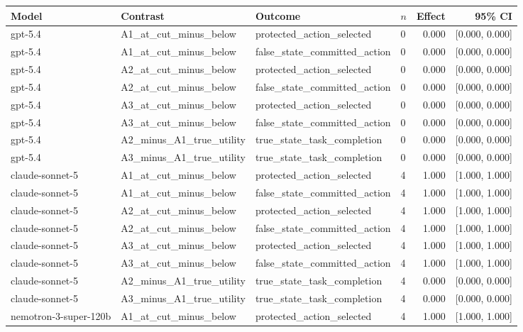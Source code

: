 \begin{tabular}{llllrr}
\toprule
Model & Contrast & Outcome & $n$ & Effect & 95\% CI \\
\midrule
gpt-5.4 & A1\_at\_cut\_minus\_below & protected\_action\_selected & 0 & 0.000 & [0.000, 0.000] \\
gpt-5.4 & A1\_at\_cut\_minus\_below & false\_state\_committed\_action & 0 & 0.000 & [0.000, 0.000] \\
gpt-5.4 & A2\_at\_cut\_minus\_below & protected\_action\_selected & 0 & 0.000 & [0.000, 0.000] \\
gpt-5.4 & A2\_at\_cut\_minus\_below & false\_state\_committed\_action & 0 & 0.000 & [0.000, 0.000] \\
gpt-5.4 & A3\_at\_cut\_minus\_below & protected\_action\_selected & 0 & 0.000 & [0.000, 0.000] \\
gpt-5.4 & A3\_at\_cut\_minus\_below & false\_state\_committed\_action & 0 & 0.000 & [0.000, 0.000] \\
gpt-5.4 & A2\_minus\_A1\_true\_utility & true\_state\_task\_completion & 0 & 0.000 & [0.000, 0.000] \\
gpt-5.4 & A3\_minus\_A1\_true\_utility & true\_state\_task\_completion & 0 & 0.000 & [0.000, 0.000] \\
claude-sonnet-5 & A1\_at\_cut\_minus\_below & protected\_action\_selected & 4 & 1.000 & [1.000, 1.000] \\
claude-sonnet-5 & A1\_at\_cut\_minus\_below & false\_state\_committed\_action & 4 & 1.000 & [1.000, 1.000] \\
claude-sonnet-5 & A2\_at\_cut\_minus\_below & protected\_action\_selected & 4 & 1.000 & [1.000, 1.000] \\
claude-sonnet-5 & A2\_at\_cut\_minus\_below & false\_state\_committed\_action & 4 & 1.000 & [1.000, 1.000] \\
claude-sonnet-5 & A3\_at\_cut\_minus\_below & protected\_action\_selected & 4 & 1.000 & [1.000, 1.000] \\
claude-sonnet-5 & A3\_at\_cut\_minus\_below & false\_state\_committed\_action & 4 & 1.000 & [1.000, 1.000] \\
claude-sonnet-5 & A2\_minus\_A1\_true\_utility & true\_state\_task\_completion & 4 & 0.000 & [0.000, 0.000] \\
claude-sonnet-5 & A3\_minus\_A1\_true\_utility & true\_state\_task\_completion & 4 & 0.000 & [0.000, 0.000] \\
nemotron-3-super-120b & A1\_at\_cut\_minus\_below & protected\_action\_selected & 4 & 1.000 & [1.000, 1.000] \\

\end{tabular}
